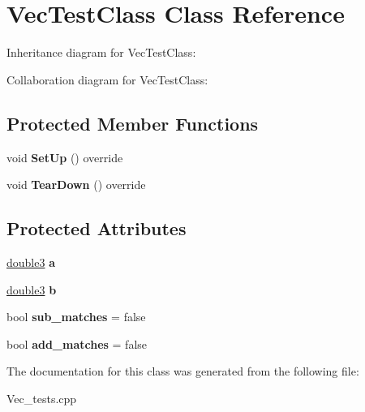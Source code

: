 \hypertarget{classVecTestClass}{}\section{Vec\+Test\+Class Class Reference}
\label{classVecTestClass}


Inheritance diagram for Vec\+Test\+Class\+:


Collaboration diagram for Vec\+Test\+Class\+:
\subsection*{Protected Member Functions}
\begin{DoxyCompactItemize}
\item 
\mbox{\label{classVecTestClass_aaf193a57eca5d29ce68feefc54301f5a}} 
void {\bfseries Set\+Up} () override
\item 
\mbox{\label{classVecTestClass_a876e182b56a6dbc0e2a57ef9c8654f2b}} 
void {\bfseries Tear\+Down} () override
\end{DoxyCompactItemize}
\subsection*{Protected Attributes}
\begin{DoxyCompactItemize}
\item 
\mbox{\label{classVecTestClass_a0c9e5f7aa81909722402f90f5770f5b4}} 
\hyperlink{class__vec3}{double3} {\bfseries a}
\item 
\mbox{\label{classVecTestClass_a98b58057e4571a8a96431f67678f6b97}} 
\hyperlink{class__vec3}{double3} {\bfseries b}
\item 
\mbox{\label{classVecTestClass_aa16462e2c2d464e46d3452b97e38940e}} 
bool {\bfseries sub\+\_\+matches} = false
\item 
\mbox{\label{classVecTestClass_a1ec1005134c2c6ed2ca6dcec5ed40b2d}} 
bool {\bfseries add\+\_\+matches} = false
\end{DoxyCompactItemize}


The documentation for this class was generated from the following file\+:\begin{DoxyCompactItemize}
\item 
Vec\+\_\+tests.\+cpp\end{DoxyCompactItemize}

